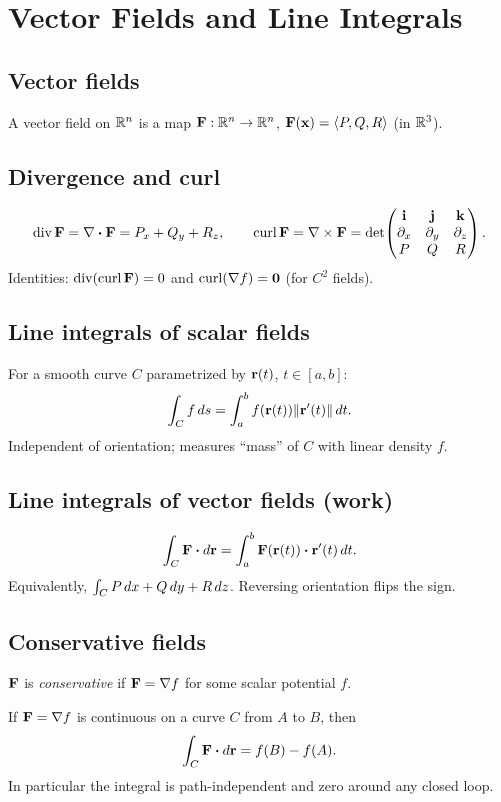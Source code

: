 \section{Vector Fields and Line Integrals}

\subsection{Vector fields}
A vector field on $\mathbb{R}^n$ is a map $\mathbf{F} : \mathbb{R}^n \to \mathbb{R}^n$, $\mathbf{F}(\mathbf{x}) = \langle P, Q, R \rangle$
(in $\mathbb{R}^3$).

\subsection{Divergence and curl}
\[
\operatorname{div} \mathbf{F} = \nabla \boldsymbol\cdot \mathbf{F} = P_x + Q_y + R_z, \qquad
\operatorname{curl} \mathbf{F} = \nabla \times \mathbf{F} =
\det\!\begin{pmatrix} \mathbf{i} & \mathbf{j} & \mathbf{k} \\ \partial_x & \partial_y & \partial_z \\ P & Q & R \end{pmatrix}.
\]
Identities: $\operatorname{div}(\operatorname{curl} \mathbf{F}) = 0$ and $\operatorname{curl}(\nabla f) = \mathbf{0}$ (for $C^2$ fields).

\subsection{Line integrals of scalar fields}
For a smooth curve $C$ parametrized by $\mathbf{r}(t)$, $t \in [a,b]$:
\[ \int_C f \, ds = \int_a^b f(\mathbf{r}(t)) \lVert \mathbf{r}'(t) \rVert \,dt. \]
Independent of orientation; measures ``mass'' of $C$ with linear density $f$.

\subsection{Line integrals of vector fields (work)}
\[ \int_C \mathbf{F} \boldsymbol\cdot d\mathbf{r} = \int_a^b \mathbf{F}(\mathbf{r}(t)) \boldsymbol\cdot \mathbf{r}'(t) \,dt. \]
Equivalently, $\int_C P \,dx + Q \,dy + R \,dz$. Reversing orientation flips the sign.

\subsection{Conservative fields}
$\mathbf{F}$ is \emph{conservative} if $\mathbf{F} = \nabla f$ for some scalar potential $f$.

\begin{theorem}
If $\mathbf{F} = \nabla f$ is continuous on a curve $C$ from $A$ to $B$, then
\[ \int_C \mathbf{F} \boldsymbol\cdot d\mathbf{r} = f(B) - f(A). \]
In particular the integral is path-independent and zero around any closed loop.
\end{theorem}

